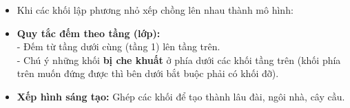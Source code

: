 \documentclass[11pt,a4paper]{article}
\begin{document}
\begin{minipage}[t]{0.49\textwidth}\vspace{0pt}
\begin{tcolorbox}[
  enhanced,
  colback=teal!4!white,
  colframe=teal!75!black,
  arc=2mm, boxrule=0.8pt,
  left=2mm, right=2mm, top=1.8mm, bottom=1.8mm,
  title={\footnotesize\bfseries\color{white}\faSliders\ 2. Kĩ năng đếm hình khối xếp chồng}
]
{\footnotesize
\begin{itemize}\setlength{\itemsep}{1pt}\setlength{\leftskip}{-2.5mm}
  \item Khi các khối lập phương nhỏ xếp chồng lên nhau thành mô hình:
  \item \textbf{Quy tắc đếm theo tầng (lớp):}\\
  - Đếm từ tầng dưới cùng (tầng 1) lên tầng trên.\\
  - Chú ý những khối \textbf{bị che khuất} ở phía dưới các khối tầng trên (khối phía trên muốn đứng được thì bên dưới bắt buộc phải có khối đỡ).
  \item \textbf{Xếp hình sáng tạo:} Ghép các khối để tạo thành lâu đài, ngôi nhà, cây cầu.
\end{itemize}
}
\end{tcolorbox}
\end{minipage}
\end{document}
